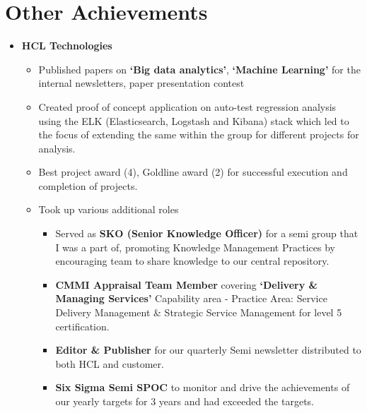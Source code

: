 \documentclass[a4paper,11pt]{article}
\begin{document}
\section*{Other Achievements}

\begin{itemize}
  \item{\bf{HCL Technologies}}
    
    \begin{itemize}
      \setlength\itemsep{-0.5em}

    \item Published papers on \textbf{`Big data analytics'},
      \textbf{`Machine Learning'} for the internal newsletters, paper
      presentation contest

    \item Created proof of concept application on auto-test
      regression analysis using the ELK (Elasticsearch, Logstash and
      Kibana) stack which led to the focus of extending the same
      within the group for different projects for analysis.

    \item Best project award (4), Goldline award (2) for successful
      execution and completion of projects.
      
    \item Took up various additional roles
      \begin{itemize}
      \setlength\itemsep{-0.5em}
        
      \item Served as \textbf{SKO (Senior Knowledge Officer)} for a
        semi group that I was a part of, promoting Knowledge
        Management Practices by encouraging team to share knowledge to
        our central repository.

      \item \textbf{CMMI Appraisal Team Member} covering
        \textbf{`Delivery \& Managing Services'} Capability area -
        Practice Area: Service Delivery Management \& Strategic
        Service Management for level 5 certification.

      \item \textbf{Editor \& Publisher} for our quarterly Semi
        newsletter distributed to both HCL and customer.
        
      \item \textbf{Six Sigma Semi SPOC} to monitor and drive the
        achievements of our yearly targets for 3 years and had
        exceeded the targets.


\end{itemize}
\end{itemize}
\end{itemize}
\end{document}
